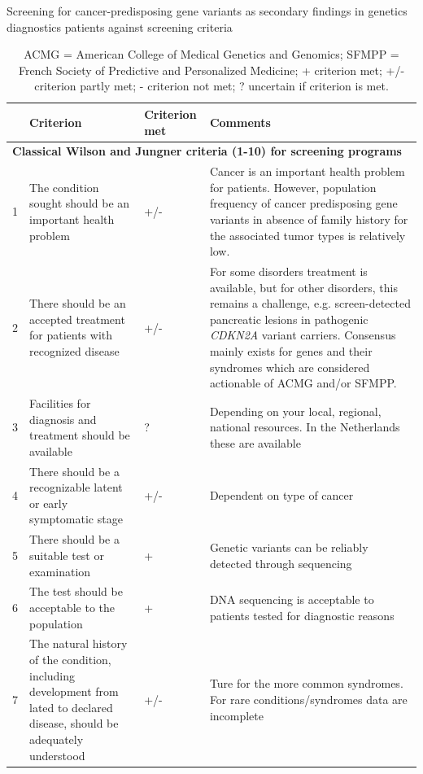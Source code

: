 \begin{table}
	\footnotesize
	\caption[Screening for secondary findings against screening criteria]{\label{table:summary}Screening for cancer-predisposing gene variants as secondary findings in genetics diagnostics patients against screening criteria}
	\begin{tabular}{ p{0.5cm} p{5.5cm} p{2cm} p{7cm} }
		 & \footnotesize{\textbf{Criterion}} & \footnotesize{\textbf{Criterion met}} & \footnotesize{\textbf{Comments}} \\
		\hline
		\multicolumn{4}{l}{\textbf{Classical Wilson and Jungner criteria (1-10) for screening programs \cite{Andermann_2008}}} \\
		\hline
		1 & The condition sought should be an important health problem & +/- & Cancer is an important health problem for patients. However, population frequency of cancer predisposing gene variants in absence of family history for the associated tumor types is relatively low. \\
		2 & There should be an accepted treatment for patients with recognized disease & +/- & For some disorders treatment is available, but for other disorders, this remains a challenge, e.g. screen-detected pancreatic lesions in pathogenic \textsl{CDKN2A} variant carriers. Consensus mainly exists for genes and their syndromes which are considered actionable of ACMG and/or SFMPP. \\
		3 & Facilities for diagnosis and treatment should be available & ? & Depending on your local, regional, national resources. In the Netherlands these are available \\
		4 & There should be a recognizable latent or early symptomatic stage & +/- & Dependent on type of cancer \\
		5 & There should be a suitable test or examination& + & Genetic variants can be reliably detected through sequencing \\
		6 & The test should be acceptable to the population & + & DNA sequencing is acceptable to patients tested for diagnostic reasons \\
		7 & The natural history of the condition, including development from lated to declared disease, should be adequately understood & +/- & Ture for the more common syndromes. For rare conditions/syndromes data are incomplete \\
		\hline
	\end{tabular}
	\caption*{ACMG = American College of Medical Genetics and Genomics; SFMPP = French Society of Predictive and Personalized Medicine; + criterion met; +/- criterion partly met; - criterion not met; ? uncertain if criterion is met.}
\end{table}

